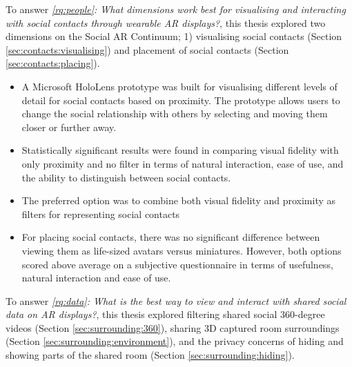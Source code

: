 \noindent
To answer \textit{\ref{rq:people}: What dimensions work best for visualising and interacting with social contacts through wearable AR displays?}, this thesis explored two dimensions on the Social AR Continuum; 1) visualising social contacts (Section \ref{sec:contacts:visualising}) and placement of social contacts (Section \ref{sec:contacts:placing}). 

\begin{itemize}
    \item{A Microsoft HoloLens prototype was built for visualising different levels of detail for social contacts based on proximity. The prototype allows users to change the social relationship with others by selecting and moving them closer or further away.}
    \item{Statistically significant results were found in comparing visual fidelity with only proximity and no filter in terms of natural interaction, ease of use, and the ability to distinguish between social contacts.}
    \item{The preferred option was to combine both visual fidelity and proximity as filters for representing social contacts}
    \item{For placing social contacts, there was no significant difference between viewing them as life-sized avatars versus miniatures. However, both options scored above average on a subjective questionnaire in terms of usefulness, natural interaction and ease of use.}
\end{itemize}

\noindent
To answer \textit{\ref{rq:data}: What is the best way to view and interact with shared social data on AR displays?}, this thesis explored filtering shared social 360-degree videos (Section \ref{sec:surrounding:360}), sharing 3D captured room surroundings (Section \ref{sec:surrounding:environment}), and the privacy concerns of hiding and showing parts of the shared room (Section \ref{sec:surrounding:hiding}). 

